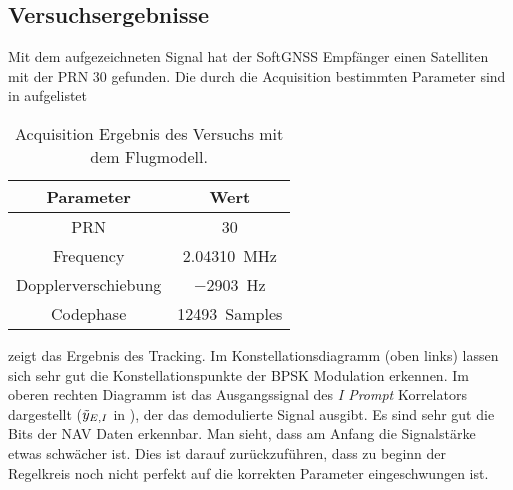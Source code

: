 \subsection{Versuchsergebnisse}
Mit dem aufgezeichneten Signal hat der SoftGNSS Empfänger einen Satelliten mit der PRN 30 gefunden. Die durch die Acquisition bestimmten Parameter sind in  aufgelistet

\begin{table}[htbp]
    \ttabbox
    {
        \caption[Acquisition Ergebnis Flugmodell]{Acquisition Ergebnis des Versuchs mit dem Flugmodell.}
        \label{FlugmodellAcquisitionErgebnisse}
    }
    {
    \begin{tabular}{c c}
        \toprule
        Parameter               & Wert \\
        \midrule
        PRN	                    & \num{30} \\
        Frequency               & \SI{2.04310}{MHz} \\
        Dopplerverschiebung     & \SI{-2903}{Hz} \\
        Codephase               & \SI{12493}{Samples} \\
        \bottomrule
    \end{tabular}
}
\end{table}

 zeigt das Ergebnis des Tracking. Im Konstellationsdiagramm (oben links) lassen sich sehr gut die Konstellationspunkte der BPSK Modulation erkennen. Im oberen rechten Diagramm ist das Ausgangssignal des \emph{I Prompt} Korrelators dargestellt ($\tilde{y}_{E,I}$ in ), der das demodulierte Signal ausgibt. Es sind sehr gut die Bits der NAV Daten erkennbar. Man sieht, dass am Anfang die Signalstärke etwas schwächer ist. Dies ist darauf zurückzuführen, dass zu beginn der Regelkreis noch nicht perfekt auf die korrekten Parameter eingeschwungen ist.

